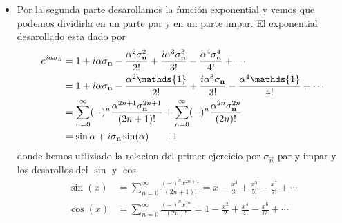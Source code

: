 \begin{solucion}
\begin{itemize}
\item Por la segunda parte desarollamos la función exponential y vemos que
podemos dividirla en un parte par y en un parte impar. El exponential
desarollado esta dado por
\begin{align*}
	e^{i\alpha \sigma_{\vec n}} &= 1 + i \alpha \sigma_{\vec n} - \frac{\alpha^2
\sigma_{\vec n}^2}{2!} + \frac{i \alpha^3 \sigma_{\vec n}^3}{3!} -
\frac{\alpha^4 \sigma_{\vec n}^4}{4!} + \cdots \\
	&= 1 + i \alpha \sigma_{\vec n} - \frac{\alpha^2
\mathds{1}}{2!} + \frac{i \alpha^3 \sigma_{\vec n}}{3!} -
\frac{\alpha^4 \mathds{1}}{4!} + \cdots \\
	&= \sum_{n=0}^\infty (-)^n \frac{\alpha^{2n+1} \sigma_{\vec
n}^{2n+1}}{(2n+1)!} + \sum_{n=0}^\infty (-)^n \frac{\alpha^{2n} \sigma_{\vec
n}^{2n}}{(2n)!} \\
	&= \sin{\alpha} + i \sigma_{\vec n} \sin(\alpha) \qed
\end{align*}
donde hemos utliziado la relacion del primer ejercicio por $\sigma_{\vec n}$ par
y impar y los desarollos del $\sin$ y $\cos$
\begin{align*}
	\sin(x) &= \sum_{n=0}^\infty \frac{(-)^n x^{2n+1}}{(2n +1)!} = x -
\frac{x^3}{3!} + \frac{x^5}{5!} - \frac{x^7}{7!} + \cdots \\
	\cos(x) &= \sum_{n=0}^\infty \frac{(-)^n x^{2n}}{(2n)!} = 1 -
\frac{x^2}{2} + \frac{x^4}{4!} - \frac{x^6}{6!} + \cdots
\end{align*}
\end{itemize}
\end{solucion}
